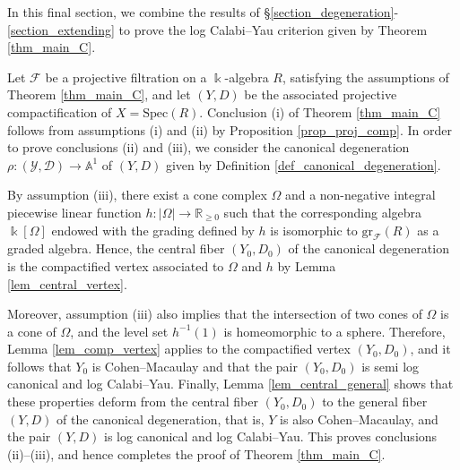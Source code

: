 \documentclass[12pt,letterpaper, reqno]{amsart}
\theoremstyle{defstyle} \newtheorem{definition}[theorem]{Definition}
\theoremstyle{remark}
\numberwithin{equation}{section}
\numberwithin{figure}{section}
\newcommand{\cF} {\mathcal{F}}
\newcommand{\Spec} {\mathrm{Spec}}
\newcommand{\gr} {\mathrm{gr}}
\newcommand{\kk} {\Bbbk}
\newcommand{\A} {\mathbb{A}}
\newcommand{\RR} {\mathbb{R}}
\newcommand{\cY} {\mathcal{Y}}
\newcommand{\cD} {\mathcal{D}}
\begin{document}
In this final section, we combine the results of 
\S \ref{section_degeneration}-\ref{section_extending}
to  prove the log Calabi--Yau criterion given by Theorem \ref{thm_main_C}.

Let $\cF$ be a projective filtration on a $\kk$-algebra $R$, satisfying the assumptions of Theorem \ref{thm_main_C}, and let $(Y,D)$ be the associated projective compactification of $X=\Spec(R)$. Conclusion (i) of Theorem \ref{thm_main_C} follows from assumptions (i) and (ii) by Proposition \ref{prop_proj_comp}. 
In order to prove conclusions (ii) and (iii), we consider the canonical degeneration $\rho: (\cY, \cD) \rightarrow \A^1$ of $(Y,D)$ given by Definition \ref{def_canonical_degeneration}. 

By assumption (iii), there exist a cone complex $\Omega$ and a non-negative integral piecewise linear function $h: |\Omega| \rightarrow \RR_{\geq 0}$ such that the corresponding algebra $\kk[\Omega]$ endowed with the grading defined by $h$ is isomorphic to 
$\gr_\cF(R)$ as a graded algebra. Hence, the central fiber $(Y_0, D_0)$ of the canonical degeneration is the compactified vertex 
associated to $\Omega$ and $h$ by Lemma \ref{lem_central_vertex}.

Moreover, assumption (iii) also implies that the intersection of two cones of $\Omega$ is a cone of $\Omega$, and the level set $h^{-1}(1)$ is homeomorphic to a sphere. 
Therefore, Lemma \ref{lem_comp_vertex} applies to the compactified vertex $(Y_0, D_0)$, and it follows that $Y_0$ is Cohen--Macaulay and that the pair $(Y_0, D_0)$ is semi log canonical and log Calabi--Yau.
Finally, Lemma \ref{lem_central_general} shows that these properties deform from the central fiber $(Y_0,D_0)$ 
to the general fiber $(Y,D)$ of the canonical degeneration, that is, $Y$ is also Cohen--Macaulay, and the pair $(Y,D)$ is log canonical and log Calabi--Yau. This proves conclusions (ii)--(iii), and hence completes the proof of  Theorem \ref{thm_main_C}.






\end{document}
